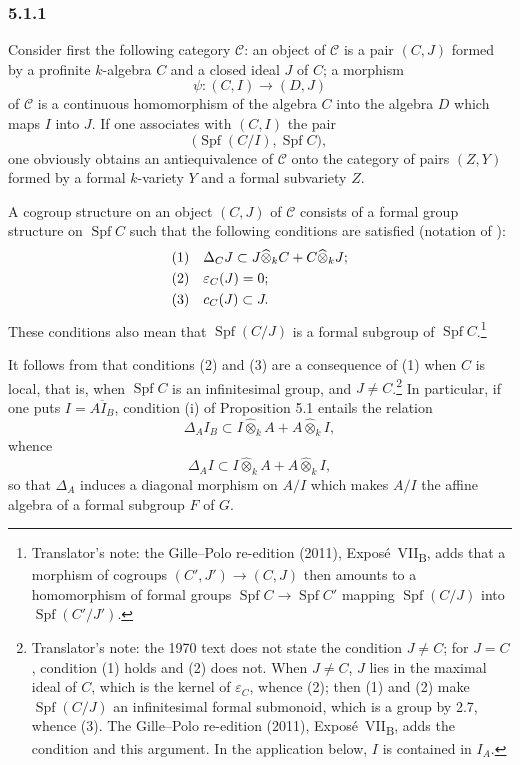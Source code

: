 
\subsubsection*{5.1.1}
\label{sga3:VIIB:5.1.1}

Consider first the following category \(\mathcal C\): an object of
\(\mathcal C\) is a pair \((C,J)\) formed by a profinite \(k\)-algebra
\(C\) and a closed ideal \(J\) of \(C\); a morphism
\[
  \psi:(C,I)\longrightarrow(D,J)
\]
of \(\mathcal C\) is a continuous homomorphism of the algebra \(C\) into
the algebra \(D\) which maps \(I\) into \(J\). If one associates with
\((C,I)\) the pair
\[
  \bigl(\operatorname{Spf}(C/I),\operatorname{Spf}C\bigr),
\]
one obviously obtains an antiequivalence of \(\mathcal C\) onto the
category of pairs \((Z,Y)\) formed by a formal \(k\)-variety \(Y\) and a
formal subvariety \(Z\).

A cogroup structure on an object \((C,J)\) of \(\mathcal C\) consists
of a formal group structure on \(\operatorname{Spf}C\) such that the
following conditions are satisfied \textup{(notation of
)}:
\[
\begin{aligned}
  \textup{(1)}\quad&
  \Delta_CJ
  \subset
  J\widehat\otimes_kC
  +
  C\widehat\otimes_kJ;
  \\
  \textup{(2)}\quad&
  \varepsilon_C(J)=0;
  \\
  \textup{(3)}\quad&
  c_C(J)\subset J.
\end{aligned}
\]
These conditions also mean that \(\operatorname{Spf}(C/J)\) is a formal
subgroup of \(\operatorname{Spf}C\).\footnote{Translator's note: the Gille--Polo re-edition (2011),
Expos\'e~VII\textsubscript{B}, adds that a morphism of cogroups \((C',J')\to(C,J)\) then amounts to a
homomorphism of formal groups \(\operatorname{Spf}C\to\operatorname{Spf}C'\) mapping
\(\operatorname{Spf}(C/J)\) into \(\operatorname{Spf}(C'/J')\).}

It follows from  that conditions (2) and (3) are a
consequence of (1) when \(C\) is local, that is, when
\(\operatorname{Spf}C\) is an infinitesimal group, and \(J\neq C\).\footnote{Translator's
note: the 1970 text does not state the condition \(J\neq C\); for \(J=C\), condition (1) holds and (2)
does not. When \(J\neq C\), \(J\) lies in the maximal ideal of \(C\), which is the kernel of
\(\varepsilon_C\), whence (2); then (1) and (2) make \(\operatorname{Spf}(C/J)\) an infinitesimal formal
submonoid, which is a group by 2.7, whence (3). The Gille--Polo re-edition (2011),
Expos\'e~VII\textsubscript{B}, adds the condition and this argument. In the application below, \(I\) is
contained in \(I_A\).} In
particular, if one puts \(I=\overline{AI_B}\), condition \textup{(i)} of
Proposition 5.1 entails the relation
\[
  \Delta_AI_B
  \subset
  I\widehat\otimes_kA+A\widehat\otimes_kI,
\]
whence
\[
  \Delta_AI
  \subset
  I\widehat\otimes_kA+A\widehat\otimes_kI,
\]
so that \(\Delta_A\) induces a diagonal morphism on \(A/I\) which makes
\(A/I\) the affine algebra of a formal subgroup \(F\) of \(G\).
